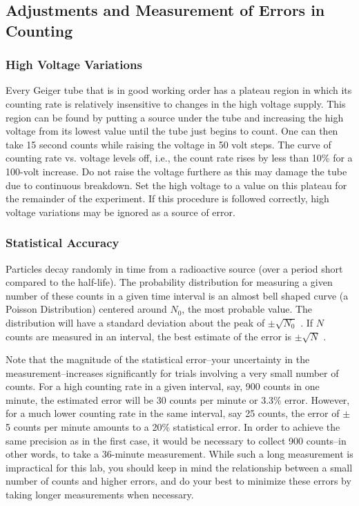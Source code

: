 \subsection{Adjustments and Measurement of Errors in Counting}
\subsubsection{High Voltage Variations}

Every Geiger tube that is in good working order has a plateau region in which its counting rate is relatively insensitive to changes in the high voltage supply. This region can be found by putting a source under the tube and increasing the high voltage from its lowest value until the tube just begins to count. One can then take 15 second counts while raising the voltage in 50 volt steps. The curve of counting rate vs. voltage levels off, i.e., the count rate rises by less than 10\% for a 100-volt increase. Do not raise the voltage furthere as this may damage the tube due to continuous breakdown. Set the high voltage to a value on this plateau for the remainder of the experiment. If this procedure is followed correctly, high voltage variations may be ignored as a source of error.

\subsubsection{Statistical Accuracy}

Particles decay randomly in time from a radioactive source (over a period short compared to the half-life). The probability distribution for measuring a given number of these counts in a given time interval is an almost bell shaped curve (a Poisson Distribution) centered around $N_0$, the most probable value. The distribution will have a standard deviation about the peak of $\pm \sqrt{N_{0}}$ . If $N$ counts are measured in an interval, the best estimate of the error is $\pm \sqrt{N}$ .\myskip

Note that the magnitude of the statistical error--your uncertainty in the measurement--increases significantly for trials involving a very small number of counts. For a high counting rate in a given interval, say, 900 counts in one minute, the estimated error will be 30 counts per minute or 3.3\% error. However, for a much lower counting rate in the same interval, say 25 counts, the error of $\pm$5 counts per minute amounts to a 20\% statistical error. In order to achieve the same precision as in the first case, it would be necessary to collect 900 counts--in other words, to take a 36-minute measurement. While such a long measurement is impractical for this lab, you should keep in mind the relationship between a small number of counts and higher errors, and do your best to minimize these errors by taking longer measurements when necessary.

